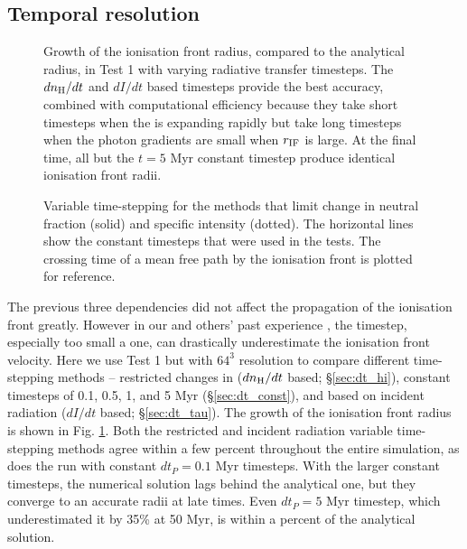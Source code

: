 \documentclass[useAMS,usenatbib]{mn2e}
\begin{document}
\subsection{Temporal resolution}
\label{sec:dt_dep}

\begin{figure}
  \caption{\label{fig:dt_dep1} Growth of the ionisation front radius,
    compared to the analytical radius, in Test 1 with varying
    radiative transfer timesteps.  The $dn_{\rm H}/dt$ and $dI/dt$
    based timesteps provide the best accuracy, combined with
    computational efficiency because they take short timesteps when
    the \hii is expanding rapidly but take long timesteps when
    the photon gradients are small when $r_{\rm IF}$ is large.  At the
    final time, all but the $t = 5$ Myr constant timestep produce
    identical ionisation front radii.}
\end{figure}
\begin{figure}
  \caption{\label{fig:dt_dep2} Variable time-stepping for the methods
    that limit change in neutral fraction (solid) and specific
    intensity (dotted).  The horizontal lines show the constant
    timesteps that were used in the tests.  The crossing time of a
    mean free path by the ionisation front is plotted for reference.}
\end{figure}

The previous three dependencies did not affect the propagation of the
ionisation front greatly.  However in our and others' past experience
\citep[e.g.][]{Shapiro04, Mellema06, Petkova09}, the timestep,
especially too small a one, can drastically underestimate the
ionisation front velocity.  Here we use Test 1 but with $64^3$
resolution to compare different time-stepping methods -- restricted
changes in \hii ($dn_{\rm H}/dt$ based; \S\ref{sec:dt_hi}),
constant timesteps of 0.1, 0.5, 1, and 5 Myr (\S\ref{sec:dt_const}),
and based on incident radiation ($dI/dt$ based; \S\ref{sec:dt_tau}).
The growth of the ionisation front radius is shown in Fig.
\ref{fig:dt_dep1}.  Both the \hii restricted and incident
radiation variable time-stepping methods agree within a few percent
throughout the entire simulation, as does the run with constant $dt_P
= 0.1$ Myr timesteps.  With the larger constant timesteps, the
numerical solution lags behind the analytical one, but they converge
to an accurate \hii radii at late times.  Even $dt_P = 5$ Myr
timestep, which underestimated it by 35\% at 50 Myr, is within a
percent of the analytical solution.
\end{document}
